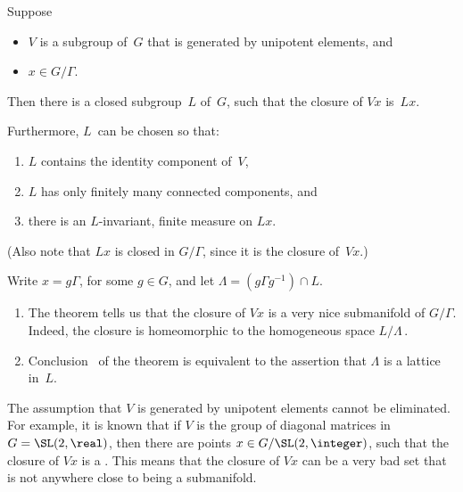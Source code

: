 \begin{namedthm} \label{Ratner-OrbitClosure}
Suppose
	\begin{itemize}
	\item $V$ is a subgroup of~$G$ that is generated by unipotent elements, 
	and
	\item $x \in G/\Gamma$.
	\end{itemize}
Then there is a closed subgroup~$L$ of~$G$, such that  the closure of\/ $V x$ is~$L x$. 

Furthermore, $L$~can be chosen so that:
	\begin{enumerate}
	\item $L$ contains the identity component of\/~$V$,
	\item \label{Ratner-OrbitClosure-AlmConn}
	$L$ has only finitely many connected components,
	and
	\item \label{Ratner-OrbitClosure-probmeas}
there is an $L$-invariant, finite measure on $L x$.
	\end{enumerate}
\end{namedthm}

(Also note that $L x$ is closed in $G/\Gamma$, since it is the closure of~$Vx$.)


\begin{rem} 
Write $x = g \Gamma$, for some $g \in G$, and let $\Lambda = (g\Gamma g^{-1}) \cap L$.
	\begin{enumerate}
	\item The theorem tells us that the closure of $V x$ is a very nice submanifold of $G/\Gamma$. Indeed, the closure is homeomorphic to the homogeneous space $L/\Lambda$\,.
	\item Conclusion~ of the theorem is equivalent to the assertion that $\Lambda$ is a lattice in~$L$.
	\end{enumerate}
\end{rem}

\begin{warn} \label{MustBeUnip}
The assumption that $V$ is generated by unipotent elements cannot be eliminated. For example, it is known that if $V$ is the group of diagonal matrices in $G = \SL(2,\real)$, then there are points $x \in G/\SL(2,\integer)$, such that the closure of $V x$ is a . This means that the closure of $V x$ can be a very bad set that is not anywhere close to being a submanifold.
\end{warn}

